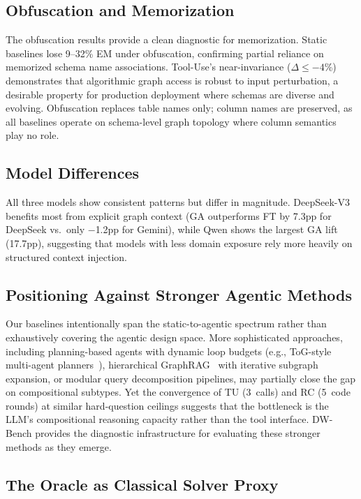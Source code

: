 \subsection{Obfuscation and Memorization}

The obfuscation results provide a clean diagnostic for memorization.
Static baselines lose 9--32\% EM under obfuscation, confirming partial
reliance on memorized schema name associations.  Tool-Use's near-invariance
($\Delta{\leq}{-}4$\%) demonstrates that
algorithmic graph access is robust to input perturbation, a desirable
property for production deployment where schemas are diverse and
evolving.
Obfuscation replaces table names only; column names are preserved,
as all baselines operate on schema-level graph topology where
column semantics play no role.

\subsection{Model Differences}

All three models show consistent patterns but differ in magnitude.
DeepSeek-V3 benefits most from explicit graph context (GA outperforms
FT by 7.3pp for DeepSeek vs.\ only $-$1.2pp for Gemini), while Qwen
shows the largest GA lift (17.7pp), suggesting that models with less
domain exposure rely more heavily on structured context injection.

\subsection{Positioning Against Stronger Agentic Methods}

Our baselines intentionally span the static-to-agentic spectrum rather
than exhaustively covering the agentic design space.  More sophisticated
approaches, including planning-based agents with dynamic loop budgets (e.g.,
ToG-style multi-agent planners~\cite{sun2024tog}), hierarchical
GraphRAG~\cite{graphrag2024} with iterative subgraph expansion, or modular
query decomposition pipelines, may partially close the gap on compositional
subtypes.  Yet the convergence of TU (3~calls) and RC (5~code rounds) at
similar hard-question ceilings suggests that the bottleneck is the
LLM's compositional reasoning capacity rather than the tool interface.
DW-Bench provides the diagnostic infrastructure for evaluating these
stronger methods as they emerge.

\subsection{The Oracle as Classical Solver Proxy}

